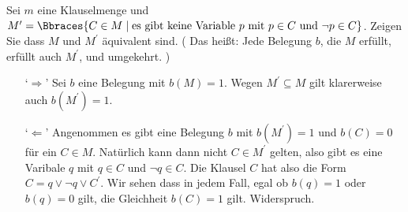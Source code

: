 
\begin{exercise}[45]

Sei $m$ eine Klauselmenge und $M^\prime = \Bbraces{C \in M \mid \text{es gibt keine Variable}~ p ~\text{mit}~ p \in C ~\text{und}~ \neg p \in C}$.
Zeigen Sie dass $M$ und $M^\prime$ äquivalent sind.
(
    Das heißt:
    Jede Belegung $b$, die $M$ erfüllt, erfüllt auch $M^\prime$, und umgekehrt.
)

\end{exercise}


\begin{solution}
\phantom{}
\begin{enumerate}
	\item[`$\Rightarrow$'] Sei $b$ eine Belegung mit $b(M) = 1$. Wegen $M^\prime \subseteq M$ gilt klarerweise auch $b(M^\prime) = 1$.
	\item[`$\Leftarrow$'] Angenommen es gibt eine Belegung $b$ mit $b(M^\prime) = 1$ und $b(C) = 0$ für ein $C \in M$. Natürlich kann dann nicht $C \in M^\prime$ gelten, also gibt es eine Varibale $q$ mit $q \in C$ und $\neg q \in C$. Die Klausel $C$ hat also die Form $ C = q \lor \neg q \lor C^\prime$. Wir sehen dass in jedem Fall, egal ob $b(q) = 1$ oder $b(q) = 0$ gilt, die Gleichheit $b(C) = 1$ gilt. Widerspruch.
\end{enumerate}
\end{solution}

